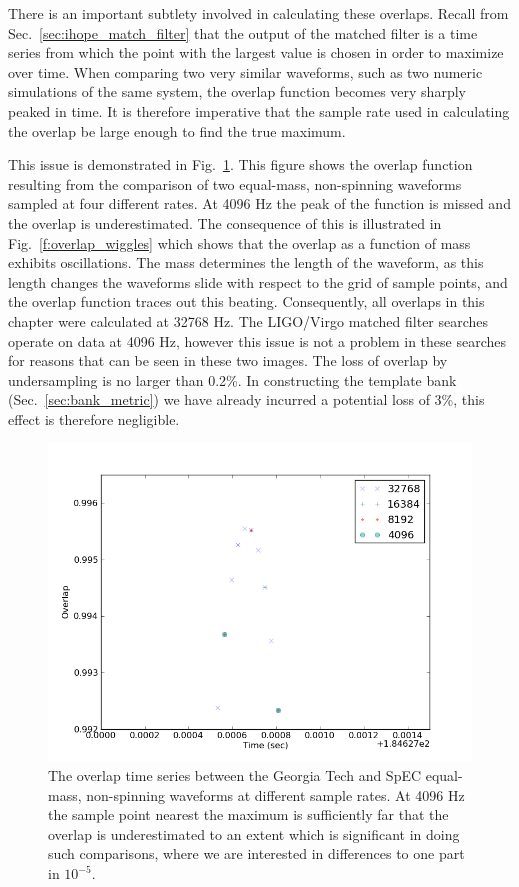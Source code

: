 There is an important subtlety involved in calculating these overlaps.
Recall from Sec.~\ref{sec:ihope_match_filter} that the output of
the matched filter is a time series from which the point with the
largest value is chosen in order to maximize over time.  When
comparing two very similar waveforms, such as two numeric simulations
of the same system, the overlap function becomes very sharply peaked
in time.  It is therefore imperative that the sample rate used in
calculating the overlap be large enough to find the true maximum.

This issue is demonstrated in Fig.~\ref{f:overlap_sample_frequency}.
This figure shows the overlap function resulting from the comparison
of two equal-mass, non-spinning waveforms sampled at four different
rates.  At 4096 Hz the peak of the function is missed and the overlap
is underestimated.  The consequence of this is illustrated in
Fig.~\ref{f:overlap_wiggles} which shows that the overlap as a
function of mass exhibits oscillations.  The mass determines the
length of the waveform, as this length changes the waveforms slide
with respect to the grid of sample points, and the overlap function
traces out this beating.  Consequently, all overlaps in this chapter
were calculated at 32768 Hz.  The LIGO/Virgo matched filter searches
operate on data at 4096 Hz, however this issue is not a problem in
these searches for reasons that can be seen in these two images.  The
loss of overlap by undersampling is no larger than 0.2\%.  In
constructing the template bank (Sec.~\ref{sec:bank_metric}) we have already 
incurred a potential loss of 3\%, this effect is therefore negligible.

\begin{figure}
  \includegraphics[width=\linewidth]{figures/ninja2/overlap_time_series}
  \caption[Sensitivity of the overlaps to sample rate]{
  \label{f:overlap_sample_frequency}
The overlap time series between the Georgia Tech and SpEC equal-mass,
non-spinning waveforms at different sample rates.  At 4096 Hz the
sample point nearest the maximum is sufficiently far that the overlap
is underestimated to an extent which is significant in doing such
comparisons, where we are interested in differences to one part in
$10^{-5}$.
}
\end{figure}%

